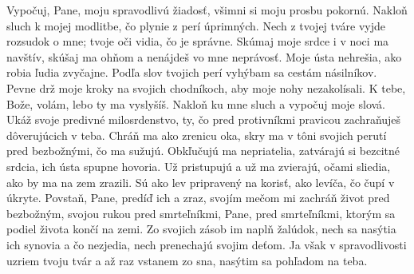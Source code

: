 Vypočuj, Pane, moju spravodlivú žiadosť,
všimni si moju prosbu pokornú.
\versseparator
Nakloň sluch k mojej modlitbe,
čo plynie z perí úprimných.
\versseparator
Nech z tvojej tváre vyjde rozsudok o mne;
tvoje oči vidia, čo je správne.
\versseparator
Skúmaj moje srdce i v noci ma navštív,
skúšaj ma ohňom a nenájdeš vo mne neprávosť.
\versseparator
Moje ústa nehrešia, ako robia ľudia zvyčajne.
Podľa slov tvojich perí vyhýbam sa cestám násilníkov.
\versseparator
Pevne drž moje kroky na svojich chodníkoch,
aby moje nohy nezakolísali.
\versseparator
K tebe, Bože, volám, lebo ty ma vyslyšíš.
Nakloň ku mne sluch a vypočuj moje slová.
\versseparator
Ukáž svoje predivné milosrdenstvo,
ty, čo pred protivníkmi pravicou zachraňuješ
dôverujúcich v teba.
Chráň ma ako zrenicu oka,
\versseparator
skry ma v tôni svojich perutí
pred bezbožnými, čo ma sužujú.
\versseparator
Obkľučujú ma nepriatelia,
zatvárajú si bezcitné srdcia,
ich ústa spupne hovoria.
\versseparator
Už pristupujú a už ma zvierajú,
očami sliedia, ako by ma na zem zrazili.
\versseparator
Sú ako lev pripravený na korisť,
ako levíča, čo čupí v úkryte.
\versseparator
Povstaň, Pane, predíď ich a zraz,
svojím mečom mi zachráň život pred bezbožným,
svojou rukou pred smrteľníkmi, Pane,
\versseparator
pred smrteľníkmi, ktorým sa podiel života končí na zemi.
Zo svojich zásob im naplň žalúdok,
\versseparator
nech sa nasýtia ich synovia
a čo nezjedia, nech prenechajú svojim deťom.
\versseparator
Ja však v spravodlivosti uzriem tvoju tvár
a až raz vstanem zo sna, nasýtim sa pohľadom na teba.
